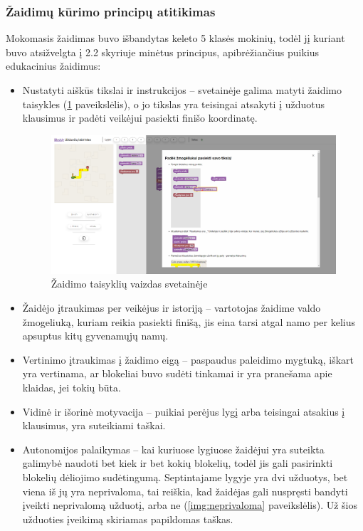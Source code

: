 \documentclass{VUMIFPSkursinis}
\begin{document}
\subsubsection{Žaidimų kūrimo principų atitikimas}
Mokomasis žaidimas buvo išbandytas keleto 5 klasės mokinių, todėl jį kuriant buvo atsižvelgta į 2.2 skyriuje minėtus principus, apibrėžiančius puikius edukacinius žaidimus: 
\begin{itemize}
    \item Nustatyti aiškūs tikslai ir instrukcijos -- svetainėje galima matyti žaidimo taisykles (\ref{img:info} paveikslėlis), o jo tikslas yra teisingai atsakyti į užduotus klausimus ir padėti veikėjui pasiekti finišo koordinatę.
        \begin{figure}[H]
        \centering
        \includegraphics[scale=0.3]{img/info.png}
        \caption{Žaidimo taisyklių vaizdas svetainėje}
        \label{img:info}
        \end{figure}
    \item Žaidėjo įtraukimas per veikėjus ir istoriją -- vartotojas žaidime valdo žmogeliuką, kuriam reikia pasiekti finišą, jis eina tarsi atgal namo per kelius apsuptus kitų gyvenamųjų namų.
    \item Vertinimo įtraukimas į žaidimo eigą -- paspaudus paleidimo mygtuką, iškart yra vertinama, ar blokeliai buvo sudėti tinkamai ir yra pranešama apie klaidas, jei tokių būta.
    \item Vidinė ir išorinė motyvacija -- puikiai perėjus lygį arba teisingai atsakius į klausimus, yra suteikiami taškai.
    \item Autonomijos palaikymas -- kai kuriuose lygiuose žaidėjui yra suteikta galimybė naudoti bet kiek ir bet kokių blokelių, todėl jis gali pasirinkti blokelių dėliojimo sudėtingumą. Septintajame lygyje yra dvi užduotys, bet viena iš jų yra neprivaloma, tai reiškia, kad žaidėjas gali nuspręsti bandyti įveikti neprivalomą užduotį, arba ne (\ref{img:neprivaloma} paveikslėlis). Už šios užduoties įveikimą skiriamas papildomas taškas.

\end{itemize}
\end{document}
